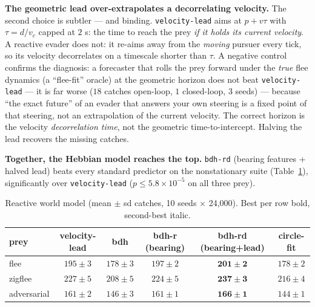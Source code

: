 \documentclass[11pt]{article}
\begin{document}
\textbf{The geometric lead over-extrapolates a decorrelating velocity.} The second choice is
subtler --- and binding. \texttt{velocity-lead} aims at $p + v\tau$ with $\tau = d/v_c$ capped at
$2$ s: the time to reach the prey \emph{if it holds its current velocity}. A reactive evader does
not: it re-aims away from the \emph{moving} pursuer every tick, so its velocity decorrelates on a
timescale shorter than $\tau$. A negative control confirms the diagnosis: a forecaster that rolls
the prey forward under the \emph{true} flee dynamics (a ``flee-fit'' oracle) at the geometric
horizon does not beat \texttt{velocity-lead} --- it is far worse ($18$ catches open-loop, $1$
closed-loop, 3 seeds) --- because ``the exact future'' of an evader that answers your own steering
is a fixed point of that steering, not an extrapolation of the current velocity. The correct
horizon is the velocity \emph{decorrelation time}, not the geometric time-to-intercept. Halving the
lead recovers the missing catches.

\textbf{Together, the Hebbian model reaches the top.} \texttt{bdh-rd} (bearing features + halved
lead) beats every standard predictor on the nonstationary suite (Table~\ref{tab:reactive}),
significantly over \texttt{velocity-lead} ($p \le 5.8 \times 10^{-5}$ on all three prey).

\begin{table}[t]
\centering
\caption{Reactive world model (mean $\pm$ sd catches, 10 seeds $\times$ 24{,}000). Best per row
bold, second-best italic.}
\label{tab:reactive}
\small
\begin{tabular}{lccccc}
\toprule
prey & velocity-lead & bdh & bdh-r (bearing) & bdh-rd (bearing+lead) & circle-fit \\
\midrule
flee       & $195 \pm 3$ & $178 \pm 3$ & \emph{$197 \pm 2$} & $\mathbf{201 \pm 2}$ & $178 \pm 2$ \\
zigflee    & \emph{$227 \pm 5$} & $208 \pm 5$ & $224 \pm 5$ & $\mathbf{237 \pm 3}$ & $216 \pm 4$ \\
adversarial& \emph{$161 \pm 2$} & $146 \pm 3$ & \emph{$161 \pm 1$} & $\mathbf{166 \pm 1}$ & $144 \pm 1$ \\
\bottomrule
\end{tabular}
\end{table}
\end{document}
